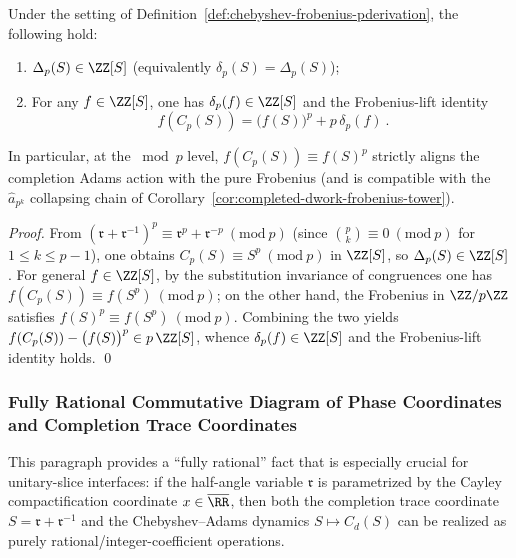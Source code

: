 \begin{proposition}\label{prop:chebyshev-frobenius-pderivation-integrality}
Under the setting of Definition~\ref{def:chebyshev-frobenius-pderivation}, the following hold:
\begin{enumerate}
  \item \(\Delta_p(S)\in\ZZ[S]\) (equivalently \(\delta_p(S)=\Delta_p(S)\));
  \item For any \(f\in\ZZ[S]\), one has \(\delta_p(f)\in\ZZ[S]\) and the Frobenius-lift identity
  \[
  \boxed{\ f(C_p(S))=\bigl(f(S)\bigr)^p+p\,\delta_p(f)\ }.
  \]
\end{enumerate}
In particular, at the \(\bmod p\) level, \(f(C_p(S))\equiv f(S)^p\) strictly aligns the completion Adams action with the pure Frobenius (and is compatible with the \(\widehat a_{p^k}\) collapsing chain of Corollary~\ref{cor:completed-dwork-frobenius-tower}).
\end{proposition}
\begin{proof}
From \((\mathfrak{r}+\mathfrak{r}^{-1})^p\equiv \mathfrak{r}^p+\mathfrak{r}^{-p}\ (\mathrm{mod}\ p)\) (since \(\binom{p}{k}\equiv 0\ (\mathrm{mod}\ p)\) for \(1\le k\le p-1\)), one obtains
\(
C_p(S)\equiv S^p\ (\mathrm{mod}\ p)
\) in \(\ZZ[S]\), so \(\Delta_p(S)\in\ZZ[S]\).
For general \(f\in\ZZ[S]\), by the substitution invariance of congruences one has
\(
f(C_p(S))\equiv f(S^p)\ (\mathrm{mod}\ p)
\);
on the other hand, the Frobenius in \(\ZZ/p\ZZ\) satisfies \(f(S)^p\equiv f(S^p)\ (\mathrm{mod}\ p)\).
Combining the two yields \(f(C_p(S))-\bigl(f(S)\bigr)^p\in p\,\ZZ[S]\), whence \(\delta_p(f)\in\ZZ[S]\) and the Frobenius-lift identity holds. \qed
\end{proof}

\subsubsection{Fully Rational Commutative Diagram of Phase Coordinates and Completion Trace Coordinates}\label{subsubsec:phase-completion-rational-exchange}
This paragraph provides a ``fully rational'' fact that is especially crucial for unitary-slice interfaces: if the half-angle variable \(\mathfrak{r}\) is parametrized by the Cayley compactification coordinate \(x\in\overline{\RR}\), then both the completion trace coordinate \(S=\mathfrak{r}+\mathfrak{r}^{-1}\) and the Chebyshev--Adams dynamics \(S\mapsto C_d(S)\) can be realized as purely rational/integer-coefficient operations.

